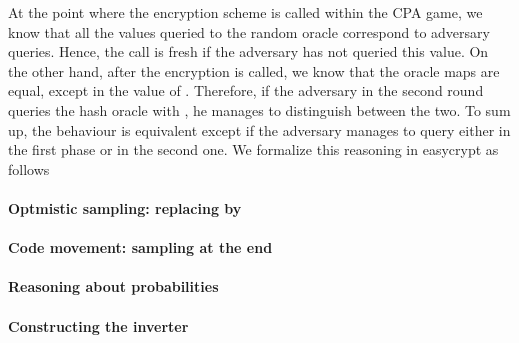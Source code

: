 At the point where the encryption scheme is called
within the CPA game, we know that all the values queried to the random
oracle correspond to adversary queries. Hence, the call is fresh if
the adversary has not queried this value. On the other hand, after the
encryption is called, we know that the oracle maps are equal, except
in the value of . Therefore, if the adversary in the second
round queries the hash oracle with , he manages to
distinguish between the two. To sum up, the behaviour is equivalent
except if the adversary manages to query  either in the
first phase or in the second one. We formalize this reasoning in
easycrypt as follows


\paragraph{Optmistic sampling: replacing  by }

\paragraph{Code movement: sampling  at the end}

\paragraph{Reasoning about probabilities}

\paragraph{Constructing the inverter}

